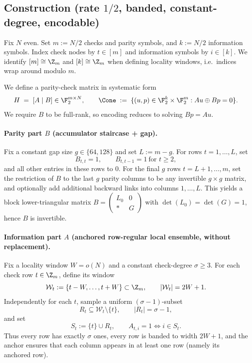 \subsection{Construction (rate $1/2$, banded, constant-degree, encodable)}
\label{subsec:outer-local-expander-construction}

Fix $N$ even. Set $m:=N/2$ checks and parity symbols, and $k:=N/2$ information symbols.
Index check nodes by $t\in[m]$ and information symbols by $i\in[k]$.
We identify $[m]\cong\Z_m$ and $[k]\cong\Z_m$ when defining locality windows, i.e.\ indices wrap around modulo $m$.

We define a parity-check matrix in systematic form
\[
H \;=\; [A \mid B] \in \F_2^{m\times N},
\qquad
\Cone \;:=\; \{(u,p)\in\F_2^k\times \F_2^m : Au \oplus Bp = 0\}.
\]
We require $B$ to be full-rank, so encoding reduces to solving $Bp=Au$.

\paragraph{Parity part $B$ (accumulator staircase + gap).}
Fix a constant gap size $g\in\{64,128\}$ and set $L:=m-g$.
For rows $t=1,\dots,L$, set
\begin{equation}
B_{t,t}=1,
\qquad
B_{t,t-1}=1\ \text{for } t\ge 2,
\label{eq:B-acc}
\end{equation}
and all other entries in these rows to $0$.
For the final $g$ rows $t=L+1,\dots,m$, set the restriction of $B$ to the last $g$ parity columns to be any
invertible $g\times g$ matrix, and optionally add additional backward links into columns $1,\dots,L$.
This yields a block lower-triangular matrix $B=\begin{pmatrix}L_0&0\\ *&G\end{pmatrix}$ with
$\det(L_0)=\det(G)=1$, hence $B$ is invertible.

\paragraph{Information part $A$ (anchored row-regular local ensemble, without replacement).}
Fix a locality window $W=o(N)$ and a constant check-degree $\sigma\ge 3$.
For each check row $t\in\Z_m$, define its window
\[
\mathcal W_t := \{t-W,\dots,t+W\}\subset\Z_m,
\qquad |\mathcal W_t|=2W+1.
\]
Independently for each $t$, sample a uniform $(\sigma-1)$-subset
\[
R_t \subseteq \mathcal W_t\setminus\{t\},
\qquad |R_t|=\sigma-1,
\]
and set
\[
S_t := \{t\}\cup R_t,
\qquad
A_{t,i}=1 \iff i\in S_t.
\]
Thus every row has exactly $\sigma$ ones, every row is banded to width $2W+1$, and the anchor ensures that each column
appears in at least one row (namely its anchored row).

